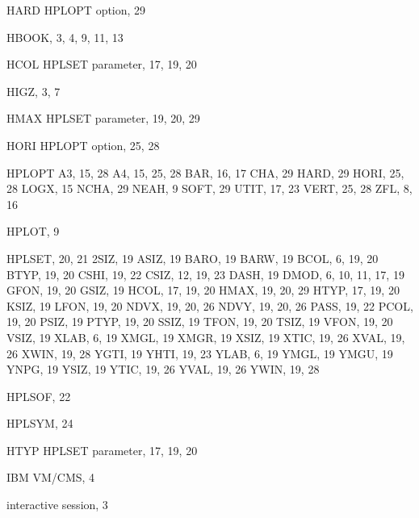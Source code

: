 \begin{theindex}
  \item HARD
    \subitem HPLOPT option, 29
  \item HBOOK, 3, 4, 9, 11, 13
  \item HCOL
    \subitem HPLSET parameter, 17, 19, 20
  \item HIGZ, 3, 7
  \item HMAX
    \subitem HPLSET parameter, 19, 20, 29
  \item HORI
    \subitem HPLOPT option, 25, 28
  \item HPLOPT
    \subitem A3, 15, 28
    \subitem A4, 15, 25, 28
    \subitem BAR, 16, 17
    \subitem CHA, 29
    \subitem HARD, 29
    \subitem HORI, 25, 28
    \subitem LOGX, 15
    \subitem NCHA, 29
    \subitem NEAH, 9
    \subitem SOFT, 29
    \subitem UTIT, 17, 23
    \subitem VERT, 25, 28
    \subitem ZFL, 8, 16
  \item HPLOT, 9
  \item HPLSET, 20, 21
    \subitem 2SIZ, 19
    \subitem ASIZ, 19
    \subitem BARO, 19
    \subitem BARW, 19
    \subitem BCOL, 6, 19, 20
    \subitem BTYP, 19, 20
    \subitem CSHI, 19, 22
    \subitem CSIZ, 12, 19, 23
    \subitem DASH, 19
    \subitem DMOD, 6, 10, 11, 17, 19
    \subitem GFON, 19, 20
    \subitem GSIZ, 19
    \subitem HCOL, 17, 19, 20
    \subitem HMAX, 19, 20, 29
    \subitem HTYP, 17, 19, 20
    \subitem KSIZ, 19
    \subitem LFON, 19, 20
    \subitem NDVX, 19, 20, 26
    \subitem NDVY, 19, 20, 26
    \subitem PASS, 19, 22
    \subitem PCOL, 19, 20
    \subitem PSIZ, 19
    \subitem PTYP, 19, 20
    \subitem SSIZ, 19
    \subitem TFON, 19, 20
    \subitem TSIZ, 19
    \subitem VFON, 19, 20
    \subitem VSIZ, 19
    \subitem XLAB, 6, 19
    \subitem XMGL, 19
    \subitem XMGR, 19
    \subitem XSIZ, 19
    \subitem XTIC, 19, 26
    \subitem XVAL, 19, 26
    \subitem XWIN, 19, 28
    \subitem YGTI, 19
    \subitem YHTI, 19, 23
    \subitem YLAB, 6, 19
    \subitem YMGL, 19
    \subitem YMGU, 19
    \subitem YNPG, 19
    \subitem YSIZ, 19
    \subitem YTIC, 19, 26
    \subitem YVAL, 19, 26
    \subitem YWIN, 19, 28
  \item HPLSOF, 22
  \item HPLSYM, 24
  \item HTYP
    \subitem HPLSET parameter, 17, 19, 20
 
  \indexspace
 
  \item IBM
    \subitem VM/CMS, 4
  \item interactive session, 3
 

\end{theindex}
